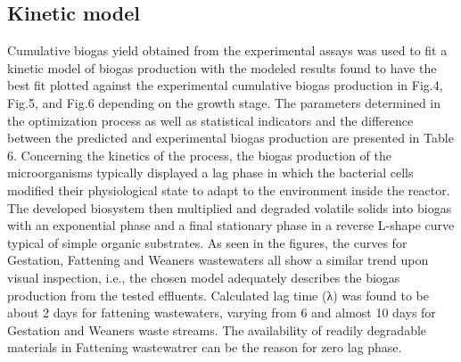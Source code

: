 \subsection{Kinetic model}
Cumulative biogas yield obtained from the experimental assays was used to fit a kinetic model of biogas production with the modeled results found to have the best fit plotted against the experimental cumulative biogas production in Fig.4, Fig.5, and Fig.6 depending on the growth stage. The parameters determined in the optimization process as well as statistical indicators and the difference between the predicted and experimental biogas production are presented in Table 6.
Concerning the kinetics of the process, the biogas production of the microorganisms typically displayed a lag phase in which the bacterial cells modified their physiological state to adapt to the environment inside the reactor. The developed biosystem then multiplied and degraded volatile solids into biogas with an exponential phase and a final stationary phase in a reverse L-shape curve typical of simple organic substrates. As seen in the figures, the curves for Gestation, Fattening and Weaners wastewaters all show a similar trend upon visual inspection, i.e., the chosen model adequately describes the biogas production from the tested effluents. Calculated lag time (λ) was found to be about 2 days for fattening wastewaters, varying from 6 and almost 10 days for Gestation and Weaners waste streams. The availability of readily degradable materials in Fattening wastewatrer can be the reason for zero lag phase.